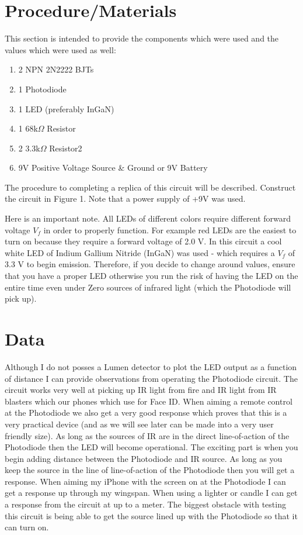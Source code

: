 \documentclass{article}
\begin{document}
\section{Procedure/Materials}
\indet This section is intended to provide the components which were used and the values which were used as well:
\begin{enumerate}
    \item 2 NPN 2N2222 BJTs
    \item 1 Photodiode
    \item 1 LED (preferably InGaN) 
    \item 1 68k$\Omega$ Resistor
    \item 2 3.3k$\Omega$ Resistor2
    \item 9V Positive Voltage Source & Ground or 9V Battery
\end{enumerate}
\indent The procedure to completing a replica of this circuit will be described. Construct the circuit in Figure 1. Note that a power supply of +9V was used. \par 
\indet Here is an important note. All LEDs of different colors require different forward voltage $V_f$ in order to properly function. For example red LEDs are the easiest to turn on because they require a forward voltage of 2.0 V. In this circuit a cool white LED of Indium Gallium Nitride (InGaN) was used - which requires a $V_f$ of 3.3 V to begin emission. Therefore, if you decide to change around values, ensure that you have a proper LED otherwise you run the risk of having the LED on the entire time even under Zero sources of infrared light (which the Photodiode will pick up). 
\section{Data}
\indent Although I do not posses a Lumen detector to plot the LED output as a function of distance I can provide observations from operating the Photodiode circuit. The circuit works very well at picking up IR light from fire and IR light from IR blasters which our phones which use for Face ID. When aiming a remote control at the Photodiode we also get a very good response which proves that this is a very practical device (and as we will see later can be made into a very user friendly size). As long as the sources of IR are in the direct line-of-action of the Photodiode then the LED will become operational. The exciting part is when you begin adding distance between the Photodiode and IR source. As long as you keep the source in the line of line-of-action of the Photodiode then you will get a response. When aiming my iPhone with the screen on at the Photodiode I can get a response up through my wingspan. When using a lighter or candle I can get a response from the circuit at up to a meter. The biggest obstacle with testing this circuit is being able to get the source lined up with the Photodiode so that it can turn on. 
\end{document}
